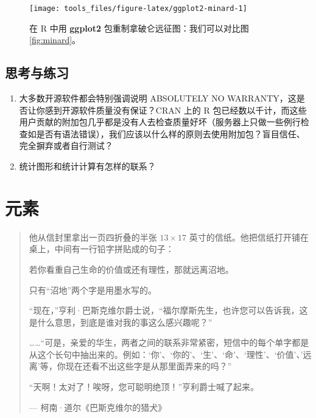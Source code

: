\documentclass[
  b5paper,
  UTF8,twoside]{book}
\begin{document}
\begin{figure}

{\centering \texttt{[image: tools\_files/figure-latex/ggplot2-minard-1]} 

}

\caption[在 R 中用 \textbf{ggplot2} 包重制拿破仑远征图]{在 R 中用 \textbf{ggplot2} 包重制拿破仑远征图：我们可以对比图 \ref{fig:minard}。}\label{fig:ggplot2-minard}
\end{figure}

\section{思考与练习}\label{ux601dux8003ux4e0eux7ec3ux4e60-1}

\begin{enumerate}
\def\labelenumi{\arabic{enumi}.}
\item
  大多数开源软件都会特别强调说明 ABSOLUTELY NO WARRANTY，这是否让你感到开源软件质量没有保证？CRAN 上的 R 包已经数以千计，而这些用户贡献的附加包几乎都是没有人去检查质量好坏（服务器上只做一些例行检查如是否有语法错误），我们应该以什么样的原则去使用附加包？盲目信任、完全摒弃或者自行测试？
\item
  统计图形和统计计算有怎样的联系？
\end{enumerate}

\chapter{元素}\label{cha:elements}

\begin{quote}
他从信封里拿出一页四折叠的半张 \(13\times17\) 英寸的信纸。他把信纸打开铺在桌上，中间有一行铅字拼贴成的句子：

若你看重自己生命的价值或还有理性，那就远离沼地。

只有``沼地''两个字是用墨水写的。

``现在，''亨利·巴斯克维尔爵士说，``福尔摩斯先生，也许您可以告诉我，这是什么意思，到底是谁对我的事这么感兴趣呢？''

\ldots\ldots{}``可是，亲爱的华生，两者之间的联系非常紧密，短信中的每个单字都是从这个长句中抽出来的。例如：`你'、`你的'、`生'、`命'、`理性'、`价值'、'远离'等，你现在还看不出这些字是从那里面弄来的吗？''

``天啊！太对了！唉呀，您可聪明绝顶！''亨利爵士喊了起来。

\hspace*{\fill} --- 柯南·道尔《巴斯克维尔的猎犬》
\end{quote}
\end{document}
